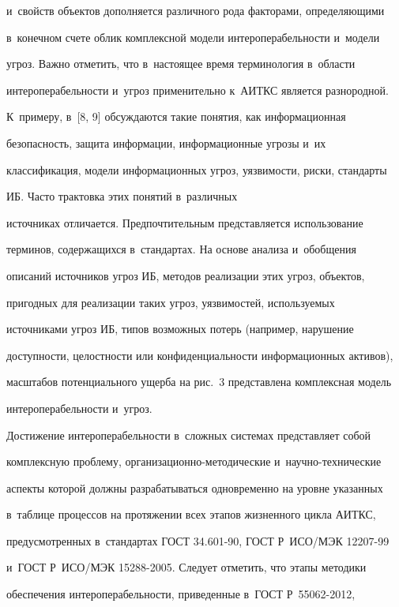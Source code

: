 и~свойств объектов дополняется различного рода факторами, определяющими 

в~конечном счете облик комплексной модели интероперабельности и~модели 

угроз. Важно отметить, что в~настоящее время терминология в~области 

интероперабельности и~угроз применительно к~АИТКС является разнородной. 

К~примеру, в~[8, 9] обсуждаются такие понятия, как информационная 

безопасность, защита информации, информационные угрозы и~их 

классификация, модели информационных угроз, уязвимости, риски, стандарты 

ИБ. Часто трактовка этих понятий в~различных 

источниках отличается. Предпочтительным представляется использование 

терминов, содержащихся в~стандартах. На основе анализа и~обобщения 

описаний источников угроз ИБ, методов реализации этих угроз, объектов, 

пригодных для реализации таких угроз, уязвимостей, используемых 

источниками угроз ИБ, типов возможных потерь (например, нарушение 

доступности, целостности или конфиденциальности информационных активов), 

масштабов потенциального ущерба на рис.~3 представлена комплексная модель 

интероперабельности и~угроз.

  



   

   Достижение интероперабельности в~сложных системах представляет собой 

комплексную проблему, организационно-методические и~научно-технические 

аспекты которой должны разрабатываться одновременно на уровне указанных 

в~таблице процессов на протяжении всех этапов жизненного цикла АИТКС, 

предусмот\-рен\-ных в~стандартах ГОСТ 34.601-90, ГОСТ Р~ИСО/МЭК 12207-99 

и~ГОСТ Р~ИСО/МЭК 15288-2005. Следует отметить, что этапы методики 

обеспечения интероперабельности, приведенные в~ГОСТ Р~55062-2012, 

